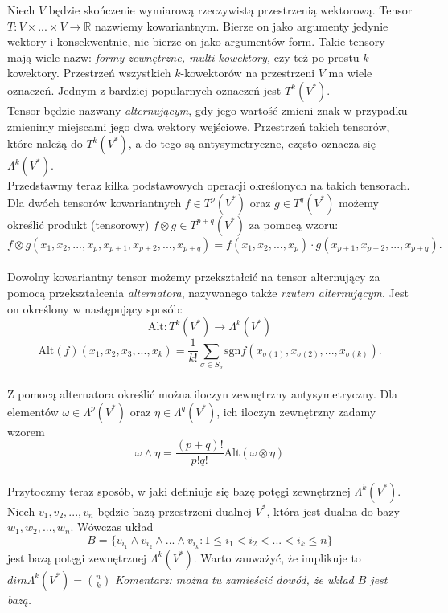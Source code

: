 \documentclass[licencjacka]{pracamgr}
\theoremstyle{definition}
\theoremstyle{definition}
\theoremstyle{plain}
\theoremstyle{plain}
\theoremstyle{plain}
\begin{document}
Niech $V$ będzie skończenie wymiarową rzeczywistą przestrzenią wektorową.
Tensor $T:V \times ... \times V \rightarrow \mathbb{R}$ nazwiemy kowariantnym.
Bierze on jako argumenty jedynie wektory i konsekwentnie, nie bierze on jako
argumentów form.  Takie tensory mają wiele nazw: \emph{formy zewnętrzne,
multi-kowektory,} czy też po prostu $k$-kowektory.  Przestrzeń wszystkich
$k$-kowektorów na przestrzeni $V$ ma wiele oznaczeń.  Jednym z bardziej
popularnych oznaczeń jest $T^k (V^\ast)$. \\

Tensor będzie nazwany \emph{alternującym}, gdy jego wartość zmieni znak w
przypadku zmienimy miejscami jego dwa wektory wejściowe.  Przestrzeń takich
tensorów, które należą do $T^k (V^\ast)$, a do tego są antysymetryczne, często
oznacza się $\Lambda^k (V^\ast)$. \\

Przedstawmy teraz kilka podstawowych operacji określonych na takich tensorach.
Dla dwóch tensorów kowariantnych $f \in T^p(V^\ast) $ oraz $g \in T^q(V^\ast) $
możemy określić produkt (tensorowy) $f \otimes g \in T^{p+q}(V^\ast) $ za
pomocą wzoru:
\[
  f \otimes g(x_1, x_2, ..., x_p, x_{p+1}, x_{p+2}, ... ,x_{p+q}) =
  f(x_1, x_2, ... , x_p) \cdot g(x_{p+1}, x_{p+2}, ... , x_{p+q}).
\] \\

Dowolny kowariantny tensor możemy
przekształcić na tensor alternujący za pomocą przekształcenia
\emph{alternatora}, nazywanego także \emph{rzutem alternującym}.
Jest on określony w następujący sposób:
\[
\text{Alt}:T^k (V^\ast) \rightarrow  \Lambda^k (V^\ast)
\]
\[
\text{Alt}(f)(x_1, x_2, x_3, ..., x_k) = \frac{1}{k!}
  \sum_{\sigma \in S_p}
     \text{sgn} f(x_{\sigma(1)}, x_{\sigma(2)}, ..., x_{\sigma(k)}).
\] \\

Z pomocą alternatora określić można iloczyn zewnętrzny antysymetryczny. 
Dla elementów $\omega \in \Lambda^p (V^\ast)$ oraz 
$\eta \in \Lambda^q (V^\ast)$, ich iloczyn zewnętrzny zadamy wzorem
\[
  \omega \wedge \eta = \frac{(p+q)!}{p!q!} \text{Alt} (\omega \otimes \eta)
\] \\

Przytoczmy teraz sposób, w jaki definiuje się bazę potęgi zewnętrznej
$\Lambda^k(V^\ast)$. Niech $v_1, v_2, ... , v_n$ będzie bazą przestrzeni dualnej
$V^\ast$, która jest dualna do bazy $w_1, w_2, ..., w_n$.
Wówczas układ
\[
  B = \{ v_{i_1} \wedge v_{i_2} \wedge ... \wedge v_{i_k} : 1 \leq i_1 < i_2 < ... <i_k \leq n \}
\]
jest bazą potęgi zewnętrznej $\Lambda^k(V^\ast)$. Warto zauważyć, że implikuje
 to $dim \Lambda^k ( V^\ast)= \binom{n}{k}$
\emph{Komentarz: można tu zamieścić dowód, że układ $B$ jest bazą. }
\end{document}
